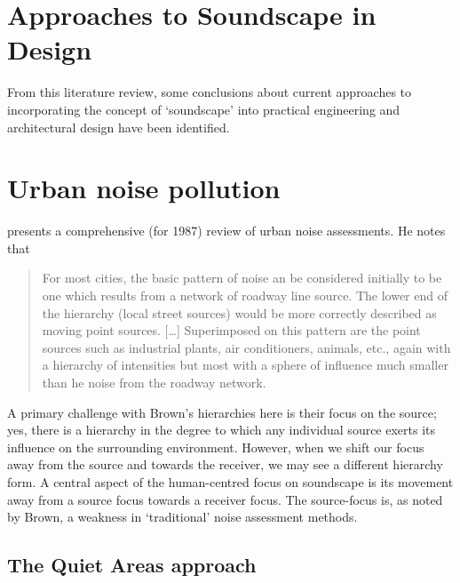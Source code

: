 \section{Approaches to Soundscape in Design}

From this literature review, some conclusions about current approaches to incorporating the concept of `soundscape' into practical engineering and architectural design have been identified.

\section{Urban noise pollution}
\citet{Brown1987Urban} presents a comprehensive (for 1987) review of urban noise assessments. He notes that

\begin{quote}
  For most cities, the basic pattern of noise an be considered initially to be one which results from a network of roadway line source. The lower end of the hierarchy (local street sources) would be more correctly described as moving point sources. [\ldots] Superimposed on this pattern are the point sources such as industrial plants, air conditioners, animals, etc., again with a hierarchy of intensities but most with a sphere of influence much smaller than he noise from the roadway network.  
\end{quote}

A primary challenge with Brown's hierarchies here is their focus on the source; yes, there is a hierarchy in the degree to which any individual source exerts its influence on the surrounding environment. However, when we shift our focus away from the source and towards the receiver, we may see a different hierarchy form. A central aspect of the human-centred focus on soundscape is its movement away from a source focus towards a receiver focus. The source-focus is, as noted by Brown, a weakness in `traditional' noise assessment methods. 



\subsection{The Quiet Areas approach}

